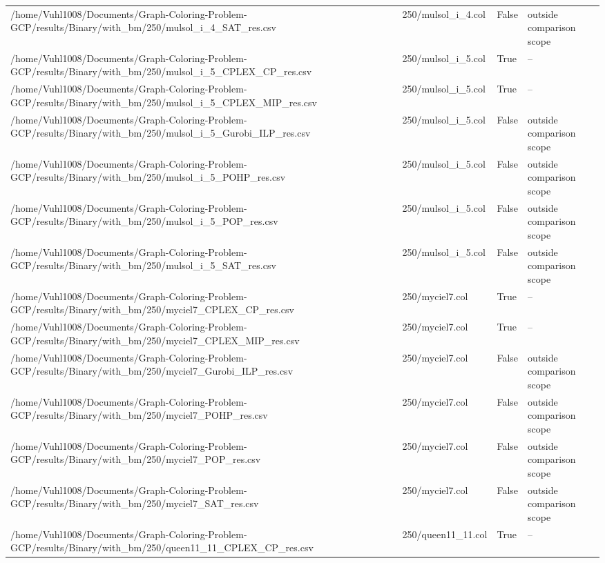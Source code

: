 \begin{table}[htbp]
\begin{tabular}{llll}
/home/Vuhl1008/Documents/Graph-Coloring-Problem-GCP/results/Binary/with\_bm/250/mulsol\_i\_4\_SAT\_res.csv & 250/mulsol\_i\_4.col & False & outside comparison scope \\
/home/Vuhl1008/Documents/Graph-Coloring-Problem-GCP/results/Binary/with\_bm/250/mulsol\_i\_5\_CPLEX\_CP\_res.csv & 250/mulsol\_i\_5.col & True & -- \\
/home/Vuhl1008/Documents/Graph-Coloring-Problem-GCP/results/Binary/with\_bm/250/mulsol\_i\_5\_CPLEX\_MIP\_res.csv & 250/mulsol\_i\_5.col & True & -- \\
/home/Vuhl1008/Documents/Graph-Coloring-Problem-GCP/results/Binary/with\_bm/250/mulsol\_i\_5\_Gurobi\_ILP\_res.csv & 250/mulsol\_i\_5.col & False & outside comparison scope \\
/home/Vuhl1008/Documents/Graph-Coloring-Problem-GCP/results/Binary/with\_bm/250/mulsol\_i\_5\_POHP\_res.csv & 250/mulsol\_i\_5.col & False & outside comparison scope \\
/home/Vuhl1008/Documents/Graph-Coloring-Problem-GCP/results/Binary/with\_bm/250/mulsol\_i\_5\_POP\_res.csv & 250/mulsol\_i\_5.col & False & outside comparison scope \\
/home/Vuhl1008/Documents/Graph-Coloring-Problem-GCP/results/Binary/with\_bm/250/mulsol\_i\_5\_SAT\_res.csv & 250/mulsol\_i\_5.col & False & outside comparison scope \\
/home/Vuhl1008/Documents/Graph-Coloring-Problem-GCP/results/Binary/with\_bm/250/myciel7\_CPLEX\_CP\_res.csv & 250/myciel7.col & True & -- \\
/home/Vuhl1008/Documents/Graph-Coloring-Problem-GCP/results/Binary/with\_bm/250/myciel7\_CPLEX\_MIP\_res.csv & 250/myciel7.col & True & -- \\
/home/Vuhl1008/Documents/Graph-Coloring-Problem-GCP/results/Binary/with\_bm/250/myciel7\_Gurobi\_ILP\_res.csv & 250/myciel7.col & False & outside comparison scope \\
/home/Vuhl1008/Documents/Graph-Coloring-Problem-GCP/results/Binary/with\_bm/250/myciel7\_POHP\_res.csv & 250/myciel7.col & False & outside comparison scope \\
/home/Vuhl1008/Documents/Graph-Coloring-Problem-GCP/results/Binary/with\_bm/250/myciel7\_POP\_res.csv & 250/myciel7.col & False & outside comparison scope \\
/home/Vuhl1008/Documents/Graph-Coloring-Problem-GCP/results/Binary/with\_bm/250/myciel7\_SAT\_res.csv & 250/myciel7.col & False & outside comparison scope \\
/home/Vuhl1008/Documents/Graph-Coloring-Problem-GCP/results/Binary/with\_bm/250/queen11\_11\_CPLEX\_CP\_res.csv & 250/queen11\_11.col & True & -- \\

\end{tabular}
\end{table}

